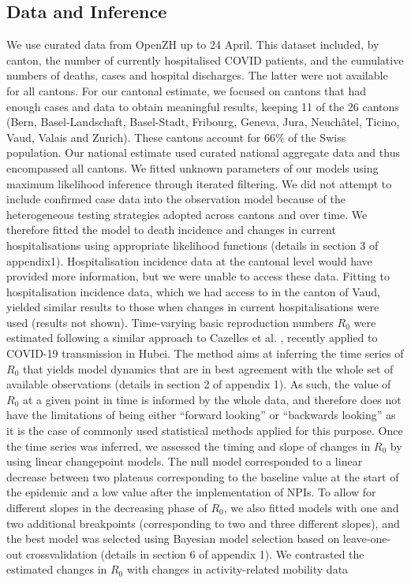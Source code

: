 \subsection{Data and Inference} 
We use curated data from OpenZH\cite{openZH:OpenZHCovid19:2020} up to 24 April. This dataset included, by canton, the number of currently hospitalised COVID patients, and the cumulative numbers of deaths, cases and hospital discharges. The latter were not available for all cantons. For our cantonal estimate, we focused on cantons that had enough cases and data to obtain meaningful results, keeping 11 of the 26 cantons (Bern, Basel-Landschaft, Basel-Stadt, Fribourg, Geneva, Jura, Neuchâtel, Ticino, Vaud, Valais and Zurich). These cantons account for 66\% of the Swiss population. Our national estimate used curated national aggregate data and thus encompassed all cantons\cite{Probst:DaenuprobstCovid19casesswitzerland:2020}. We fitted unknown parameters of our models using maximum likelihood inference through iterated filtering\cite{Ionides:InferenceDynamicLatent:2015}. We did not attempt to include confirmed case data into the observation model because of the heterogeneous testing strategies adopted across cantons and over time. We therefore fitted the model to death incidence and changes in current hospitalisations using appropriate likelihood functions (details in section 3 of appendix1). Hospitalisation incidence data at the cantonal level would have provided more information, but we were unable to access these data. Fitting to hospitalisation incidence data, which we had access to in the canton of Vaud, yielded similar results to those when changes in current hospitalisations were used (results not shown). Time-varying basic reproduction numbers $R_0$ were estimated following a similar approach to Cazelles et al. \cite{Cazelles:AccountingNonstationarityEpidemiology:2018}, recently applied to COVID-19 transmission in Hubei\cite{Kucharski:EarlyDynamicsTransmission:2020}. The method aims at inferring the time series of $R_0$ that yields model dynamics that are in best agreement with the whole set of available observations (details in section 2 of appendix 1). As such, the value of $R_0$ at a given point in time is informed by the whole data, and therefore does not have the limitations of being either “forward looking” or “backwards looking” as it is the case of commonly used statistical methods applied for this purpose\cite{Wallinga:DifferentEpidemicCurves:2004,Cori:NewFrameworkSoftware:2013}. Once the time series was inferred, we assessed the timing and slope of changes in $R_0$ by using linear changepoint models\cite{Lindelov:McpPackageRegression:2020}. The null model corresponded to a linear decrease between two plateaus corresponding to the baseline value at the start of the epidemic and a low value after the implementation of NPIs. To allow for different slopes in the decreasing phase of $R_0$, we also fitted models with one and two additional breakpoints (corresponding to two and three different slopes), and the best model was selected using Bayesian model selection based on leave-one-out crossvalidation (details in section 6 of appendix 1). We contrasted the estimated changes in $R_0$ with changes in activity-related mobility data 